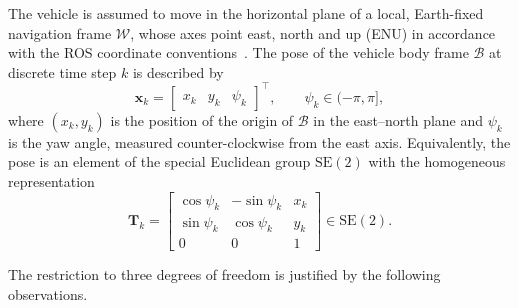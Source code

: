 The vehicle is assumed to move in the horizontal plane of a local,
Earth-fixed navigation frame $\mathcal{W}$, whose axes point east, north and
up (ENU) in accordance with the ROS coordinate conventions~\cite{rep103}.
The pose of the vehicle body frame $\mathcal{B}$ at discrete time step $k$
is described by
\begin{equation}
  \mathbf{x}_k =
  \begin{bmatrix} x_k & y_k & \psi_k \end{bmatrix}^{\top},
  \qquad \psi_k \in (-\pi, \pi],
  \label{eq:planar-pose}
\end{equation}
where $(x_k, y_k)$ is the position of the origin of $\mathcal{B}$ in the
east--north plane and $\psi_k$ is the yaw angle, measured counter-clockwise
from the east axis. Equivalently, the pose is an element of the special
Euclidean group $\mathrm{SE}(2)$ with the homogeneous representation
\begin{equation}
  \mathbf{T}_k =
  \begin{bmatrix}
    \cos\psi_k & -\sin\psi_k & x_k \\
    \sin\psi_k & \cos\psi_k  & y_k \\
    0          & 0           & 1
  \end{bmatrix} \in \mathrm{SE}(2).
  \label{eq:planar-se2}
\end{equation}

The restriction to three degrees of freedom is justified by the following
observations.


